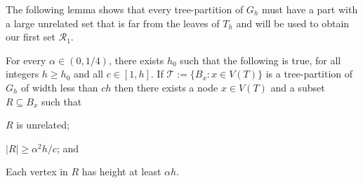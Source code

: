 \documentclass{patmorin}
\renewcommand{\ge}{\geqslant}
\begin{document}
The following lemma shows that every tree-partition of $G_h$ must have a part with a large unrelated set that is far from the leaves of $T_h$ and will be used to obtain our first set $\mathcal{R}_1$.

\begin{lem}\label{startup}
  For every $\alpha\in(0,1/4)$, there exists $h_0$ such that the following is true, for all integers $h\ge  h_0$ and all $c\in[1,h]$.  If $\mathcal{T}:=\{B_x:x\in V(T)\}$ is a tree-partition of $G_h$ of width less than $ch$ then there exists a node $x\in V(T)$ and a subset $R\subseteq B_x$ such that
  \begin{compactenum}[(i)]
    \item $R$ is unrelated;
    \item $|R|\ge \alpha^2 h/c$; and
    \item Each vertex in $R$ has height at least $\alpha h$.
  \end{compactenum}
\end{lem}
\end{document}
